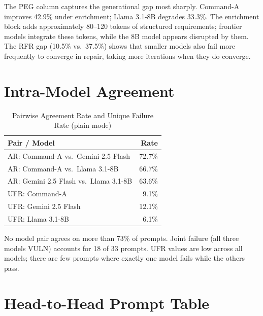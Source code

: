 \documentclass[12pt,a4paper]{report}
\begin{document}
The PEG column captures the generational gap most sharply. Command-A improves
42.9\% under enrichment; Llama 3.1-8B degrades 33.3\%. The enrichment block
adds approximately 80--120 tokens of structured requirements; frontier models
integrate these tokens, while the 8B model appears disrupted by them.
The RFR gap (10.5\% vs.\ 37.5\%) shows that smaller models also fail more
frequently to converge in repair, taking more iterations when they do converge.

\section{Intra-Model Agreement}
\label{sec:intramodel}

\begin{table}[H]
\centering
\caption{Pairwise Agreement Rate and Unique Failure Rate (plain mode)}
\label{tab:agreement}
\renewcommand{\arraystretch}{1.3}
\begin{tabular}{@{}lr@{}}
\toprule
\textbf{Pair / Model}                      & \textbf{Rate} \\
\midrule
AR: Command-A vs.\ Gemini 2.5 Flash       & 72.7\% \\
AR: Command-A vs.\ Llama 3.1-8B          & 66.7\% \\
AR: Gemini 2.5 Flash vs.\ Llama 3.1-8B  & 63.6\% \\
\midrule
UFR: Command-A                            &  9.1\% \\
UFR: Gemini 2.5 Flash                    & 12.1\% \\
UFR: Llama 3.1-8B                        &  6.1\% \\
\bottomrule
\end{tabular}
\end{table}

No model pair agrees on more than 73\% of prompts. Joint failure (all three models
VULN) accounts for 18 of 33 prompts. UFR values are low across all models; there
are few prompts where exactly one model fails while the others pass.

\section{Head-to-Head Prompt Table}
\label{sec:h2h}
\end{document}
